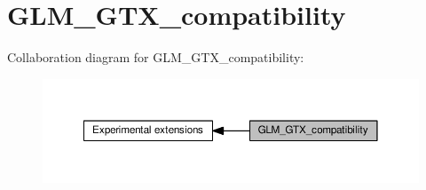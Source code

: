 \hypertarget{group__gtx__compatibility}{}\section{G\+L\+M\+\_\+\+G\+T\+X\+\_\+compatibility}
\label{group__gtx__compatibility}
Collaboration diagram for G\+L\+M\+\_\+\+G\+T\+X\+\_\+compatibility\+:
\nopagebreak
\begin{figure}[H]
\begin{center}
\leavevmode
\includegraphics[width=350pt]{d5/d8c/group__gtx__compatibility}
\end{center}
\end{figure}
